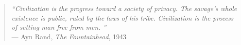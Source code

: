 \newcommand{\citationAuteur}{\enquote{Civilization is the progress toward a society of privacy. The savage's whole existence is public, ruled by the laws of his tribe. Civilization is the process of setting man free from men.
}}
\newcommand{\auteurCite}{Ayn Rand}
\newcommand{\titreOeuvre}{The Fountainhead}
\newcommand{\dateCitation}{1943}

\begin{quote}
    \begin{center}
    \vspace*{\fill}
    \emph{\citationAuteur} \\
    \vspace{0.5cm}
    --- \auteurCite, \emph{\titreOeuvre}, \dateCitation
    \vspace*{\fill}
    \end{center}
    \end{quote}